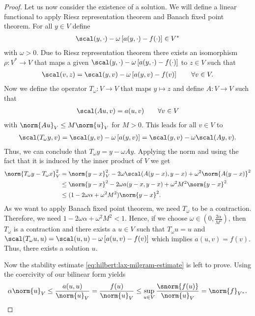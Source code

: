 \begin{proof}
  Let us now consider the existence of a solution.
  We will define a linear functional to apply Riesz representation theorem
  and Banach fixed point theorem.
  For all $y\in V$ define
  \begin{gather*}
    \scal(y,\cdot) - \omega\left[a(y,\cdot) -f(\cdot)\right] \in V^*
  \end{gather*}
  with $\omega>0$.
  Due to Riesz representation theorem there exists an isomorphism $\rho:V^*\rightarrow V$
  that maps a given $\scal(y,\cdot) - \omega \left[ a(y,\cdot)-f(\cdot) \right]$
  to $z\in V$ such that
  \begin{gather*}
    \scal(v,z) = \scal(y,v) - \omega\left[a(y,v) - f(v) \right] \qquad \forall v\in V.
  \end{gather*}
  Now we define the operator $T_\omega:V\rightarrow V$ that maps $y\mapsto z$ and
  define $A:V\rightarrow V$ such that
  \begin{gather*}
    \scal(Au,v) = a(u,v) \qquad \forall v\in V 
  \end{gather*}
  with $\norm{Au}_V \leq M \norm{u}_V$ for $M>0$.
  This leads for all $v\in V$ to
  \begin{gather*}
    \scal(T_\omega y,v)
    = \scal(y,v) - \omega\left[a(y,v) \right]
    = \scal(y,v) - \omega \scal(Ay,v).
  \end{gather*}
  Thus, we can conclude that $T_\omega y=y-\omega Ay$.
  Applying the norm and using the fact that it is induced by the inner product of $V$
  we get
  \begin{gather*}
    \begin{aligned}
      \norm{T_\omega y - T_\omega x}_V^2 &= \norm{y-x}_V^2 - 2 \omega \scal(A(y-x),y-x) + \omega^2 \norm{A(y-x)}^2 \\
      &\leq \norm{y-x}^2 - 2\omega a(y-x,y-x) + \omega^2 M^2 \norm{y-x}^2 \\
      &\leq (1-2\omega\alpha + \omega^2 M^2) \norm{y-x}^2.
    \end{aligned}
  \end{gather*}
  As we want to apply Banach fixed point theorem, we need $T_\omega$ to be a contraction.
  Therefore, we need $1-2\omega\alpha + \omega^2 M^2 < 1$.
  Hence, if we choose $\omega\in\left(0,\frac{2\alpha}{M^2}\right)$, then $T_\omega$ is a
  contraction and there exists a $u\in V$ such that $T_\omega u = u$
  and $\scal(T_\omega u,u) = \scal(u,u) - \omega\left[ a(u,v) - f(v) \right]$
  which implies $a(u,v)=f(v)$.
  Thus, there exists a solution $u$.

  Now the stability estimate \eqref{eq:hilbert:lax-milgram-estimate} is left to prove.
  Using the coercivity of our bilinear form yields
  \begin{gather*}
    \alpha \norm{u}_V \leq \frac{a(u,u)}{\norm{u}_V} = \frac{f(u)}{\norm{u}_V} \leq \sup_{u\in V} \frac{\snorm{f(u)}}{\norm{u}_V} = \norm{f}_{V^*}.
  \end{gather*}
\end{proof}

